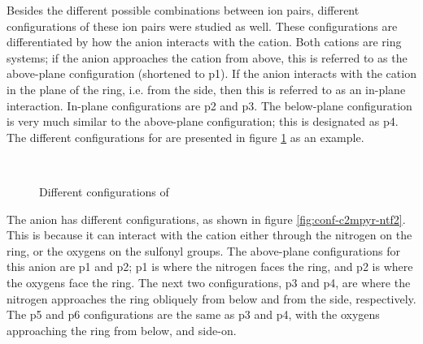 Besides the different possible combinations between ion pairs, different configurations of these ion pairs were studied as well. 
These configurations are differentiated by how the anion interacts with the cation.
Both cations are ring systems; if the anion approaches the cation from above, this is referred to as the above-plane configuration (shortened to p1).
If the anion interacts with the cation in the plane of the ring, i.e. from the side, then this is referred to as an in-plane interaction.
In-plane configurations are p2 and p3.
The below-plane configuration is very much similar to the above-plane configuration; this is designated as p4.
The different configurations for  are presented in figure
\protect\ref{fig:conf-c3mim-br}
as an example. 

\begin{figure}
    \centering
    \mbox{
    }
    \mbox{
    }                                 
    \caption{Different configurations of \protect{} \label{fig:conf-c3mim-br}}
\end{figure}

The \ntf anion has different configurations, as shown in figure
\ref{fig:conf-c2mpyr-ntf2}.
This is because it can interact with the cation either through the nitrogen on the ring, or the oxygens on the sulfonyl groups. 
The above-plane configurations for this anion are p1 and p2; p1 is where the nitrogen faces the ring, and p2 is where the oxygens face the ring.
The next two configurations, p3 and p4, are where the nitrogen approaches the ring obliquely from below and from the side, respectively.
The p5 and p6 configurations are the same as p3 and p4, with the oxygens approaching the ring from below, and side-on.


